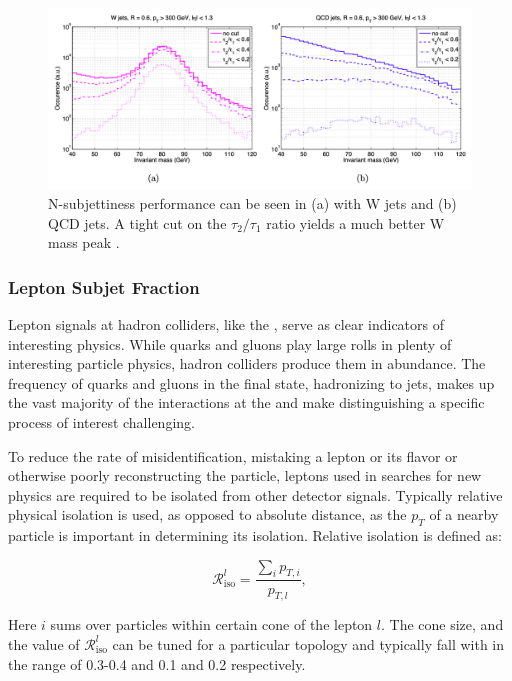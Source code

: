 \begin{figure}[!tp]
    \centering
    \includegraphics[width=\textwidth]{figures/Nsubjettiness_paper.png}
    \caption[
        N-subjettiness performance \LHC
    ]    
    {
        N-subjettiness performance can be seen in (a) with W jets and (b) QCD jets.  A tight cut on the \ensuremath{\tau_{2}/\tau_{1}} ratio yields a much better W mass peak \cite{Nsubjettiness}.
    }
    \label{fig:nsubjettiness}

\end{figure}
\subsubsection{Lepton Subjet Fraction}

Lepton signals at hadron colliders, like the \LHC, serve as clear indicators of interesting physics.  While quarks and gluons play large rolls in plenty of interesting particle physics, hadron colliders produce them in abundance.  The frequency of quarks and gluons in the final state, hadronizing to jets, makes up the vast majority of the interactions at the \LHC and make distinguishing a specific process of interest challenging.

To reduce the rate of misidentification, mistaking a lepton or its flavor or otherwise poorly reconstructing the particle, leptons used in searches for new physics are required to be isolated from other detector signals.  Typically relative physical isolation is used, as opposed to absolute distance, as the \ensuremath{p_T} of a nearby particle is important in determining its isolation.  Relative isolation is defined as:

\begin{equation}
    \label{eq:relISO}
    \mathcal{R}_{\text{iso}}^{l}
    =
    \frac{\sum_{i}p_{T,i}}{p_{T,l}},
\end{equation}

Here \ensuremath{i} sums over particles within certain cone of the lepton \ensuremath{l}.  The cone size, and the value of \ensuremath{\mathcal{R}_{\text{iso}}^{l}} can be tuned for a particular topology and typically fall with in the range of 0.3-0.4 and 0.1 and 0.2 respectively.

